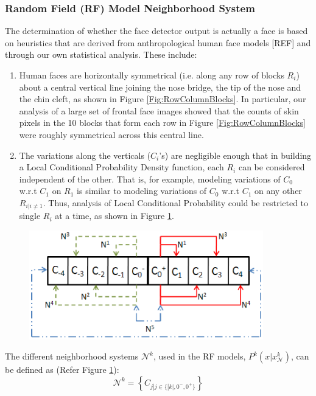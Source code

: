 \documentclass[times, 10pt,twocolumn]{article}
\begin{document}
\subsubsection{Random Field (RF) Model Neighborhood System}\label{Neighborhood}The determination of whether the
face detector output is actually a face is based on heuristics that
are derived from anthropological human face models [REF] and through
our own statistical analysis. These include:
\begin{enumerate}
\item Human faces are horizontally symmetrical (i.e. along any row of blocks $R_i$)
about a  central vertical line joining the nose bridge, the tip of
the nose and the chin cleft, as shown in Figure
\ref{Fig:RowColumnBlocks}.  In particular, our analysis of a large
set of frontal face images showed that the counts of skin pixels in
the 10 blocks that form each row in Figure \ref{Fig:RowColumnBlocks}
were roughly symmetrical across this central line.

\item The variations along the verticals ($C_i$'s) are negligible enough
that in building a Local Conditional Probability Density function,
each $R_i$ can be considered independent of the other. That is, for
example, modeling variations of $C_0$ w.r.t $C_1$ on $R_1$ is
similar to modeling variations of $C_0$ w.r.t $C_1$ on any other
$R_{i|i\ne1}$. Thus, analysis of Local Conditional Probability could
be restricted to single $R_i$ at a time, as shown in Figure
\ref{Fig:Neighborhood}.
\end{enumerate}

\begin{figure}[h]
\hspace{-0.3in}
\includegraphics[width=4in]{Figure8.eps} \caption{{\bf
{\selectfont }}} \label{Fig:Neighborhood}
\end{figure}

The different neighborhood systems $\mathcal N^k$, used in the RF
models, $P^k(x\vert x_{\mathcal N}^k)$, can be defined as (Refer
Figure \ref{Fig:Neighborhood}):
\begin{equation}
\mathcal N^k = \left\{C_{j | j \in \{|k|, 0^-, 0^+\}}\right\}
\end{equation}
\end{document}
